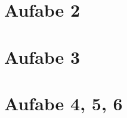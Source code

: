 \documentclass[10pt,oneside,a4paper]{article}
\begin{document}
  \section{Aufabe 2}
    \begin{center}
    \end{center}
  \section{Aufabe 3}
	\begin{center}
    \end{center}
  \section{Aufabe 4, 5, 6}
 	
\end{document}
